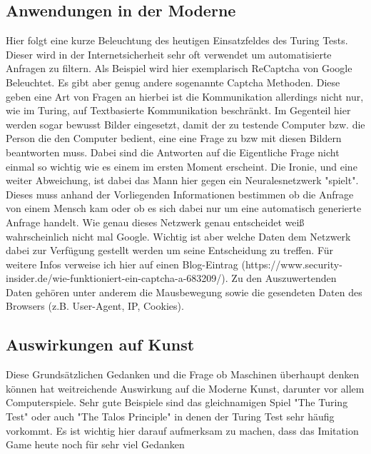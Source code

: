 \subsection{Anwendungen in der Moderne}
Hier folgt eine kurze Beleuchtung des heutigen Einsatzfeldes des Turing Tests. Dieser wird in der Internetsicherheit sehr oft verwendet um automatisierte Anfragen zu filtern. Als Beispiel wird hier exemplarisch ReCaptcha von Google Beleuchtet. Es gibt aber genug andere sogenannte Captcha Methoden. Diese geben eine Art von Fragen an hierbei ist die Kommunikation allerdings nicht nur, wie im Turing, auf Textbasierte Kommunikation beschränkt. Im Gegenteil hier werden sogar bewusst Bilder eingesetzt, damit der zu testende Computer bzw. die Person die den Computer bedient, eine eine Frage zu bzw mit diesen Bildern beantworten muss. Dabei sind die Antworten auf die Eigentliche Frage nicht einmal so wichtig wie es einem im ersten Moment erscheint. Die Ironie, und eine weiter Abweichung, ist dabei das Mann hier gegen ein Neuralesnetzwerk "spielt". Dieses muss anhand der Vorliegenden Informationen bestimmen ob die Anfrage von einem Mensch kam oder ob es sich dabei nur um eine automatisch generierte Anfrage handelt. Wie genau dieses Netzwerk genau entscheidet weiß wahrscheinlich nicht mal Google. Wichtig ist aber welche Daten dem Netzwerk dabei zur Verfügung gestellt werden um seine Entscheidung zu treffen. Für weitere Infos verweise ich hier auf einen Blog-Eintrag (https://www.security-insider.de/wie-funktioniert-ein-captcha-a-683209/). Zu den Auszuwertenden Daten gehören unter anderem die Mausbewegung sowie die gesendeten Daten des Browsers (z.B. User-Agent, IP, Cookies).
\subsection{Auswirkungen auf Kunst}
Diese Grundsätzlichen Gedanken und die Frage ob Maschinen überhaupt denken können hat weitreichende Auswirkung auf die Moderne Kunst, darunter vor allem Computerspiele. Sehr gute Beispiele sind das gleichnamigen Spiel "The Turing Test" oder auch "The Talos Principle" in denen der Turing Test sehr häufig vorkommt. Es ist wichtig hier darauf aufmerksam zu machen, dass das Imitation Game heute noch für sehr viel Gedanken 

